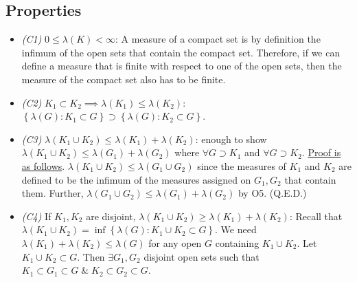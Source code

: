 \documentclass[11pt]{article}
\begin{document}
\subsection{Properties}
\begin{itemize}
  \item \emph{(C1)} $0\leq \lambda\left(K\right) < \infty$: A measure of a compact set is by definition the infimum of the open sets that contain the compact set. Therefore, if we can define a measure that is finite with respect to one of the open sets, then the measure of the compact set also has to be finite.
  \item \emph{(C2)} $K_{1} \subset K_{2} \implies \lambda\left(K_{1}\right) \leq \lambda\left(K_{2}\right)$: $\left\{\lambda\left(G\right): K_{1}\subset G \right\} \supset \left\{\lambda\left(G\right): K_{2}\subset G \right\}$.
  \item \emph{(C3)} $\lambda\left(K_{1}\cup K_{2}\right) \leq \lambda\left(K_{1}\right) + \lambda\left(K_{2}\right)$: enough to show $\lambda\left(K_{1}\cup K_{2}\right) \leq \lambda\left(G_{1}\right) + \lambda\left(G_{2}\right)$ where $\forall G \supset K_{1}$ and $\forall G \supset K_{2}$. \underline{Proof is as follows}. $\lambda\left(K_{1}\cup K_{2}\right) \leq \lambda\left(G_{1}\cup G_{2}\right)$ since the measures of $K_{1}$ and $K_{2}$ are defined to be the infimum of the measures assigned on $G_{1}, G_{2}$ that contain them. Further, $\lambda\left(G_{1}\cup G_{2}\right) \leq \lambda\left(G_{1}\right) +\lambda\left(G_{2}\right)$ by O5. (Q.E.D.)
  \item \emph{(C4)} If $K_{1}, K_{2}$ are disjoint, $\lambda\left(K_{1}\cup K_{2}\right) \geq \lambda\left(K_{1}\right)+\lambda\left(K_{2}\right)$: Recall that $\lambda\left(K_{1}\cup K_{2}\right) = \inf \left\{\lambda\left(G\right): K_{1}\cup K_{2}\subset G \right\}$. We need $\lambda\left(K_{1}\right) +\lambda\left(K_{2}\right) \leq \lambda\left(G\right)$ for any open $G$ containing $K_{1}\cup K_{2}$. Let $K_{1}\cup K_{2} \subset G$. Then $\exists G_{1}, G_{2}$ disjoint open sets such that $K_{1} \subset G_{1} \subset G \; \& \; K_{2} \subset G_{2} \subset G$.
\end{itemize}
\end{document}
